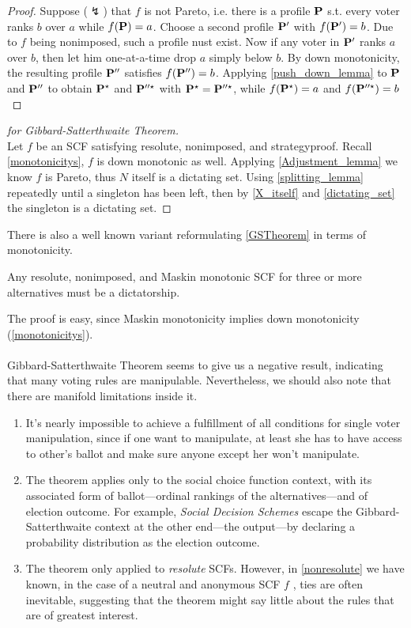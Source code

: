 \begin{proof}
    Suppose ($\lightning$) that $f$ is not Pareto, i.e. there is a profile $\mathbf{P}$ s.t. every voter ranks $b$ over $a$ while $f(\mathbf{P}) = a$. Choose a second profile $\mathbf{P}'$ with $f(\mathbf{P}') = b$. Due to $f$ being nonimposed, such a profile nust exist. Now if any voter in $\mathbf{P}'$ ranks $a$ over $b$, then let him one-at-a-time drop $a$ simply below $b$. By down monotonicity, the resulting profile $\mathbf{P}''$ satisfies $f(\mathbf{P}'') = b$. Applying \cref{push_down_lemma} to $\mathbf{P}$ and $\mathbf{P}''$ to obtain $\mathbf{P}^\star$ and $\mathbf{P}''^\star$ with $\mathbf{P}^\star = \mathbf{P}''^\star$, while $f(\mathbf{P}^\star) = a$ and $f(\mathbf{P}''^\star) = b$
\end{proof}

\begin{proof}[for Gibbard-Satterthwaite Theorem]
    ~\\
    Let $f$ be an SCF satisfying resolute, nonimposed, and strategyproof. Recall \cref{monotonicitys}, $f$ is down monotonic as well. Applying \cref{Adjustment_lemma} we know $f$ is Pareto, thus $N$ itself is a dictating set. Using \cref{splitting_lemma} repeatedly until a singleton has been left, then by \cref{X_itself} and \cref{dictating_set} the singleton is a dictating set.
\end{proof}

There is also a well known variant reformulating \cref{GSTheorem} in terms of monotonicity.

\begin{theorem}
    Any resolute, nonimposed, and Maskin monotonic SCF for three or more alternatives must be a dictatorship.
\end{theorem}

The proof is easy, since Maskin monotonicity implies down monotonicity (\cref{monotonicitys}).\\
~\\
Gibbard-Satterthwaite Theorem seems to give us a negative result, indicating that many voting rules are manipulable. Nevertheless, we should also note that there are manifold limitations inside it.

\begin{enumerate}
    \item It's nearly impossible to achieve a fulfillment of all conditions for single voter manipulation, since if one want to manipulate, at least she has to have access to other's ballot and make sure anyone except her won't manipulate.
    \item The theorem applies only to the social choice function context, with its associated form of ballot---ordinal rankings of the alternatives---and of election outcome. For example, \textit{Social Decision Schemes} escape the Gibbard-Satterthwaite context at the other end---the output---by declaring a probability distribution as the election outcome.
    \item The theorem only applied to \emph{resolute} SCFs. However, in \cref{nonresolute} we have known, in the case of a neutral and anonymous SCF $f$ , ties are often inevitable, suggesting that the theorem might say little about the rules that are of greatest interest.
\end{enumerate}

